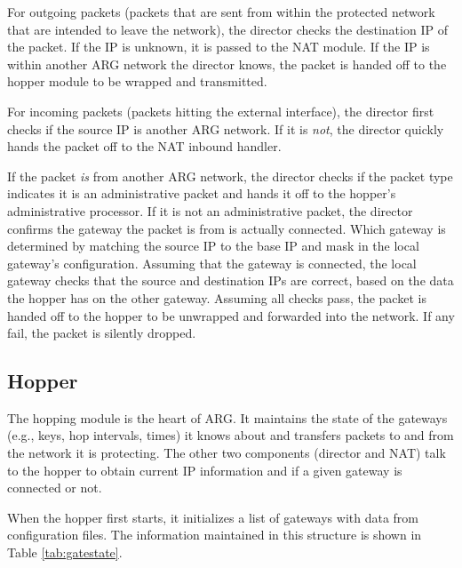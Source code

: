 \par For outgoing packets (packets that are sent from within the protected network that are intended to leave the network), the director checks the destination \ac{IP} of the packet. If the IP is unknown, it is passed to the \ac{NAT} module. If the IP is within another \ac{ARG} network the director knows, the packet is handed off to the hopper module to be wrapped and transmitted.

\par For incoming packets (packets hitting the external interface), the director first checks if the source IP is another ARG network. If it is \textit{not}, the director quickly hands the packet off to the NAT inbound handler.

\par If the packet \textit{is} from another ARG network, the director checks if the packet type indicates it is an administrative packet and hands it off to the hopper's administrative processor. If it is not an administrative packet, the director confirms the gateway the packet is from is actually connected. Which gateway is determined by matching the source \ac{IP} to the base \ac{IP} and mask in the local gateway's configuration. Assuming that the gateway is connected, the local gateway checks that the source and destination \acp{IP} are correct, based on the data the hopper has on the other gateway. Assuming all checks pass, the packet is handed off to the hopper to be unwrapped and forwarded into the network. If any fail, the packet is silently dropped.

\subsection{Hopper}
\label{sec:arg_hopper}
\par The hopping module is the heart of ARG. It maintains the state of the gateways (e.g., keys, hop intervals, times) it knows about and transfers packets to and from the network it is protecting. The other two components (director and \ac{NAT}) talk to the hopper to obtain current IP information and if a given gateway is connected or not. 

\par When the hopper first starts, it initializes a list of gateways with data from configuration files. The information maintained in this structure is shown in Table \ref{tab:gatestate}. 

